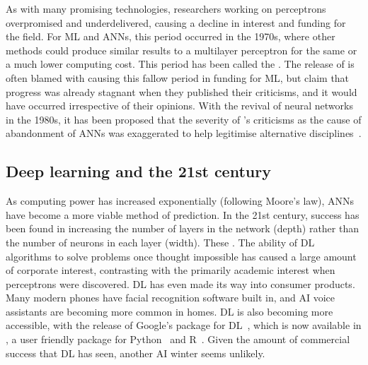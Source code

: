 As with many promising technologies, researchers working on perceptrons overpromised and underdelivered, causing a decline in interest and funding for the field.
For ML and \acp{ANN}, this period occurred in the 1970s, where other methods could produce similar results to a multilayer perceptron for the same or a much lower computing cost.
This period has been called the .
The release of  is often blamed with causing this fallow period in funding for ML, but \citeauthor{minsky1987} claim that progress was already stagnant when they published their criticisms, and it would have occurred irrespective of their opinions.
With the revival of neural networks in the 1980s, it has been proposed that the severity of \citeauthor{minsky1987}'s criticisms as the cause of abandonment of \acp{ANN} was exaggerated to help legitimise alternative disciplines~\autocite[649]{olazaran1996}.

\subsection{Deep learning and the 21st century} \label{deeplearning}

As computing power has increased exponentially (following Moore's law), \acp{ANN} have become a more viable method of prediction.
In the 21st century, success has been found in increasing the number of layers in the network (depth) rather than the number of neurons in each layer (width).
These  .
The ability of \ac{DL} algorithms to solve problems once thought impossible has caused a large amount of corporate interest, contrasting with the primarily academic interest when perceptrons were discovered.
\ac{DL} has even made its way into consumer products.
Many modern phones have facial recognition software built in, and \ac{AI} voice assistants are becoming more common in homes.
\ac{DL} is also becoming more accessible, with the release of Google's  package for \ac{DL}~\autocite{abadi2016}, which is now available in , a user friendly package for Python~\autocite{chollet2015} and R~\autocite{allaire2018}.
Given the amount of commercial success that \ac{DL} has seen, another AI winter seems unlikely.
